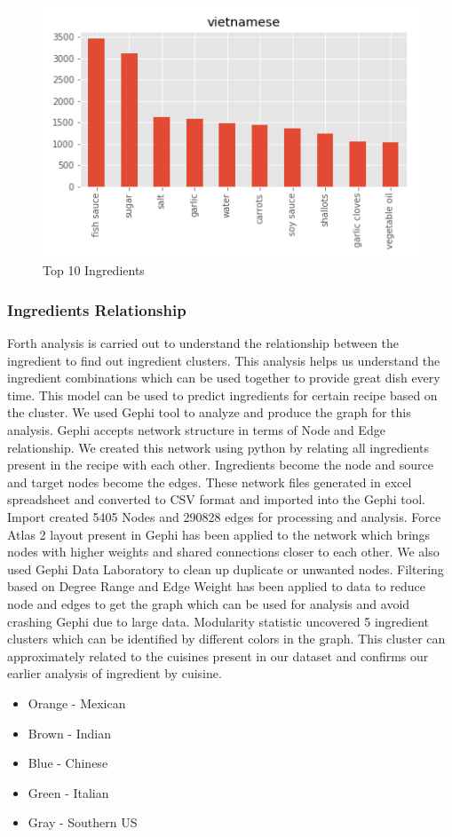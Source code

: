 \documentclass[sigconf]{acmart}
\begin{document}
\begin{figure}[!ht]
  \centering\includegraphics[width=\columnwidth]{images/vietnamese_10_most_used_ingredients.png}
  \caption{Top 10 Ingredients }\label{f:vietnamese_10_most_used_ingredients}
\end{figure}


\subsubsection{Ingredients Relationship}
Forth analysis is carried out to understand the relationship between the ingredient to find out ingredient clusters. This analysis helps us understand the ingredient combinations which can be used together to provide great dish every time. This model can be used to predict ingredients for certain recipe based on the cluster. We used Gephi tool to analyze and produce the graph for this analysis. Gephi accepts network structure in terms of Node and Edge relationship. We created this network using python by relating all ingredients present in the recipe with each other. Ingredients become the node and source and target nodes become the edges. These network files generated in excel spreadsheet and converted to CSV format and imported into the Gephi tool. Import created 5405 Nodes and 290828 edges for processing and analysis. Force Atlas 2 layout present in Gephi has been applied to the network which brings nodes with higher weights and shared connections closer to each other. We also used Gephi Data Laboratory to clean up duplicate or unwanted nodes. Filtering based on Degree Range and Edge Weight has been applied to data to reduce node and edges to get the graph which can be used for analysis and avoid crashing Gephi due to large data. Modularity statistic uncovered 5 ingredient clusters which can be identified by different colors in the graph. This cluster can approximately related to the cuisines present in our dataset and confirms our earlier analysis of ingredient by cuisine.
\begin{itemize}
\item Orange - Mexican
\item Brown  - Indian
\item Blue   - Chinese
\item Green  - Italian
\item Gray   - Southern US
\end{itemize}
\end{document}
